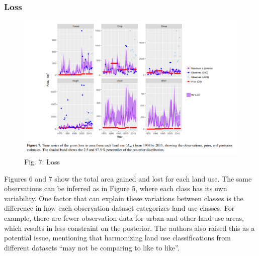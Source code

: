 \documentclass[
  letterpaper,
  DIV=11,
  numbers=noendperiod]{scrartcl}
\begin{document}
\subsubsection{Loss}

\begin{figure}

{\centering \includegraphics{bayesian_final_project_files/figures/fig_7.png}

}

\caption{Fig. 7: Loss}

\end{figure}

Figures 6 and 7 show the total area gained and lost for each land use.
The same observations can be inferred as in Figure 5, where each class
has its own variability. One factor that can explain these variations
between classes is the difference in how each observation dataset
categorizes land use classes. For example, there are fewer observation
data for urban and other land-use areas, which results in less
constraint on the posterior. The authors also raised this as a potential
issue, mentioning that harmonizing land use classifications from
different datasets ``may not be comparing to like to like''.
\end{document}
